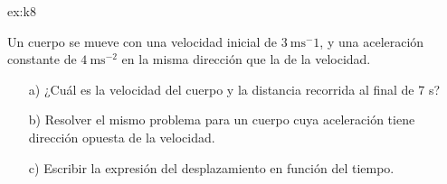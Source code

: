 \begin{multicols}{2}
    \begin{excercise}[][][a) $v=31\ \mathrm{ms^{-1}}$,  $x=19\ \mathrm{m}$; b)  $v=-255\ \mathrm{ms^{-1}}$,  $x=77\ \mathrm{m}$;]{ex:k8}{
            Un cuerpo se mueve con una velocidad inicial de $3\  \mathrm{m s^-1}$, y una aceleración constante de $4 \ \mathrm{ m s^{-2}}$ en la misma dirección que la de la velocidad. 
            \begin{itemize}
                \item[a)]  ¿Cuál es la velocidad del cuerpo y la distancia recorrida al final de 7 s?                 
                \item[b)] Resolver el mismo problema para un cuerpo cuya aceleración tiene dirección opuesta de la velocidad.                
                \item[c)]  Escribir la expresión del desplazamiento en función del tiempo.
            \end{itemize}           
         }
    \end{excercise}
    

\end{multicols}

